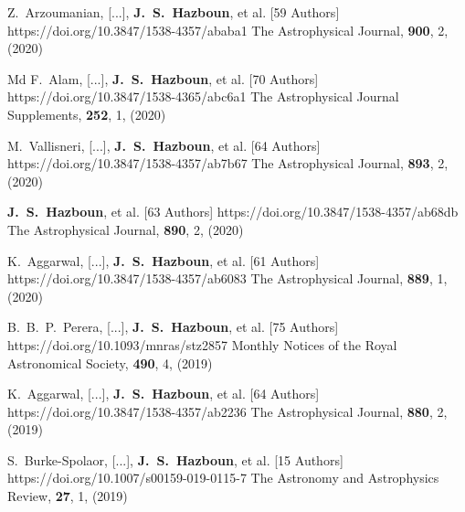          {Z.~{Arzoumanian}, [...], \textbf{J.~S.~{Hazboun}}, et al. [59 Authors]}
         {https://doi.org/10.3847/1538-4357/ababa1}
         {{The Astrophysical Journal}, \textbf{900}, 2, (2020)}

         {Md F.~{Alam}, [...], \textbf{J.~S.~{Hazboun}}, et al. [70 Authors]}
         {https://doi.org/10.3847/1538-4365/abc6a1}
         {{The Astrophysical Journal Supplements}, \textbf{252}, 1, (2020)}

         {M.~{Vallisneri}, [...], \textbf{J.~S.~{Hazboun}}, et al. [64 Authors]}
         {https://doi.org/10.3847/1538-4357/ab7b67}
         {{The Astrophysical Journal}, \textbf{893}, 2, (2020)}

         {\textbf{J.~S.~{Hazboun}}, et al. [63 Authors]}
         {https://doi.org/10.3847/1538-4357/ab68db}
         {{The Astrophysical Journal}, \textbf{890}, 2, (2020)}

         {K.~{Aggarwal}, [...], \textbf{J.~S.~{Hazboun}}, et al. [61 Authors]}
         {https://doi.org/10.3847/1538-4357/ab6083}
         {{The Astrophysical Journal}, \textbf{889}, 1, (2020)}

         {B.~B.~P.~{Perera}, [...], \textbf{J.~S.~{Hazboun}}, et al. [75 Authors]}
         {https://doi.org/10.1093/mnras/stz2857}
         {{Monthly Notices of the Royal Astronomical Society}, \textbf{490}, 4, (2019)}

         {K.~{Aggarwal}, [...], \textbf{J.~S.~{Hazboun}}, et al. [64 Authors]}
         {https://doi.org/10.3847/1538-4357/ab2236}
         {{The Astrophysical Journal}, \textbf{880}, 2, (2019)}

         {S.~{Burke-Spolaor}, [...], \textbf{J.~S.~{Hazboun}}, et al. [15 Authors]}
         {https://doi.org/10.1007/s00159-019-0115-7}
         {{The Astronomy and Astrophysics Review}, \textbf{27}, 1, (2019)}

